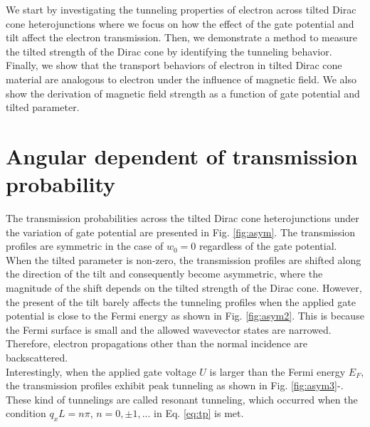 We start by investigating the tunneling properties of electron across tilted Dirac cone heterojunctions where we focus on how
the effect of the gate potential and tilt affect the electron transmission.  
Then, we demonstrate a method to measure the tilted strength of the Dirac cone by identifying the tunneling behavior.
Finally, we show that the transport behaviors of electron in tilted Dirac cone material are analogous to electron under
the influence of magnetic field. We also show the derivation of magnetic field strength as a function of gate potential and tilted parameter.


\section{Angular dependent of transmission probability} \label{sec:asym}
    The transmission probabilities across the tilted Dirac cone heterojunctions under the variation of gate potential are presented in Fig. \ref{fig:asym}.
    The transmission profiles are symmetric in the case of $w_0 = 0$ regardless of the gate potential. 
    When the tilted parameter is non-zero, the transmission profiles are shifted along the direction of the tilt and consequently become asymmetric, where the magnitude of the shift depends on the tilted strength of the Dirac cone.
    However, the present of the tilt barely affects the tunneling profiles when the applied gate potential is close to the Fermi energy as shown in Fig. \ref{fig:asym2}.
    This is because the Fermi surface is small and the allowed wavevector states are narrowed. Therefore, electron propagations other than the normal incidence are backscattered.\\
    
    Interestingly, when the applied gate voltage $U$ is larger than the Fermi energy $E_F$, the transmission profiles exhibit peak tunneling as shown in Fig. \ref{fig:asym3}-.
    These kind of tunnelings are called resonant tunneling, which occurred when the condition $q_x L = n \pi$, $n = 0, \pm1,...$ in Eq. \ref{eq:tp} is met.
    
